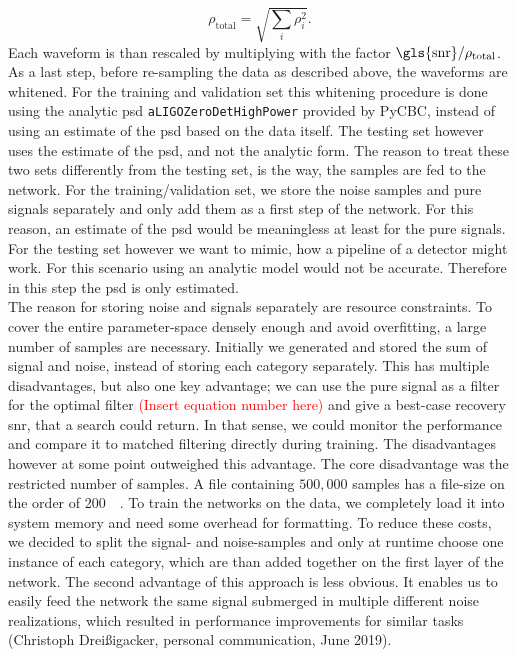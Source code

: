 \begin{equation}
\rho_\text{total} = \sqrt{\sum_i\rho_i^2}.
\end{equation}
Each waveform is than rescaled by multiplying with the factor $\text{\gls{snr}} / \rho_\text{total}$. As a last step, before re-sampling the data as described above, the waveforms are whitened. For the training and validation set this whitening procedure is done using the analytic \gls{psd} \verb|aLIGOZeroDetHighPower| provided by PyCBC, instead of using an estimate of the \gls{psd} based on the data itself. The testing set however uses the estimate of the \gls{psd}, and not the analytic form. The reason to treat these two sets differently from the testing set, is the way, the samples are fed to the network. For the training/validation set, we store the noise samples and pure signals separately and only add them as a first step of the network. For this reason, an estimate of the \gls{psd} would be meaningless at least for the pure signals. For the testing set however we want to mimic, how a pipeline of a detector might work. For this scenario using an analytic model would not be accurate. Therefore in this step the \gls{psd} is only estimated.\\
The reason for storing noise and signals separately are resource constraints. To cover the entire parameter-space densely enough and avoid overfitting, a large number of samples are necessary. Initially we generated and stored the sum of signal and noise, instead of storing each category separately. This has multiple disadvantages, but also one key advantage; we can use the pure signal as a filter for the optimal filter \textcolor{red}{(Insert equation number here)} and give a best-case recovery \gls{snr}, that a search could return. In that sense, we could monitor the performance and compare it to matched filtering directly during training. The disadvantages however at some point outweighed this advantage. The core disadvantage was the restricted number of samples. A file containing $500,000$ samples has a file-size on the order of \SI{200}{\giga\byte}. To train the networks on the data, we completely load it into system memory and need some overhead for formatting. To reduce these costs, we decided to split the signal- and noise-samples and only at runtime choose one instance of each category, which are than added together on the first layer of the network. The second advantage of this approach is less obvious. It enables us to easily feed the network the same signal submerged in multiple different noise realizations, which resulted in performance improvements for similar tasks (Christoph Dreißigacker, personal communication, June 2019).\\
